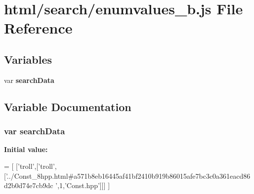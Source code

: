 \section{html/search/enumvalues\-\_\-b.js File Reference}
\label{enumvalues__b_8js}
\subsection*{Variables}
\begin{DoxyCompactItemize}
\item 
var {\bf search\-Data}
\end{DoxyCompactItemize}


\subsection{Variable Documentation}
\subsubsection[{search\-Data}]{\setlength{\rightskip}{0pt plus 5cm}var search\-Data}\label{enumvalues__b_8js_ad01a7523f103d6242ef9b0451861231e}
{\bfseries Initial value\-:}
\begin{DoxyCode}
=
[
  [\textcolor{stringliteral}{'troll'},[\textcolor{stringliteral}{'troll'},[\textcolor{stringliteral}{'../Const\_8hpp.html#a571b8eb16445af41bf2410b919b86015afe7bc3c0a361eacd86d2b0d74e7cb9dc
      '},1,\textcolor{stringliteral}{'Const.hpp'}]]]
]
\end{DoxyCode}

